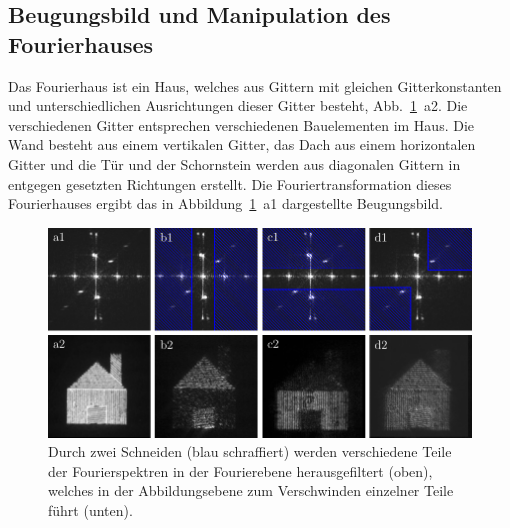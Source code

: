 


\subsection{Beugungsbild und Manipulation des Fourierhauses}

Das Fourierhaus ist ein Haus, welches aus Gittern mit gleichen Gitterkonstanten und unterschiedlichen Ausrichtungen dieser Gitter besteht, Abb.~\ref{fig:fourierhaus_mit_filtern}~a2. Die verschiedenen Gitter entsprechen verschiedenen Bauelementen im Haus. Die Wand besteht aus einem vertikalen Gitter, das Dach aus einem horizontalen Gitter und die Tür und der Schornstein werden aus diagonalen Gittern in entgegen gesetzten Richtungen erstellt. Die Fouriertransformation dieses Fourierhauses ergibt das in Abbildung~\ref{fig:fourierhaus_mit_filtern}~a1 dargestellte Beugungsbild.

\begin{figure}[h]
	\centering
	\includegraphics[scale=1]{images/Regina/abb21.pdf}
	
	\caption[Fourierhaus mit verschiedenen Filtern]{
		Durch zwei Schneiden (blau schraffiert) werden verschiedene Teile der Fourierspektren in der Fourierebene herausgefiltert (oben), welches in der Abbildungsebene zum Verschwinden einzelner Teile führt (unten).
	}
	\label{fig:fourierhaus_mit_filtern}
\end{figure}

